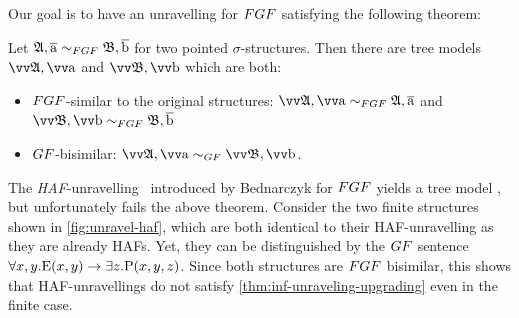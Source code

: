 Our goal is to have an  unravelling for $\FGF$ satisfying the following theorem:
\begin{theorem}\label{thm:inf-unraveling-upgrading}
  Let $\str{A}, \elemtuplea \bisimto_{\FGF} \str{B}, \elemtupleb$ for two pointed $\sigma$-structures.
  Then there are tree models $\unravel{A}, \elemtuptuplea$ and $\unravel{B}, \elemtuptupleb$ which are both:
  \begin{itemize}
    \item $\FGF$-similar to the original structures: $\unravel{A}, \elemtuptuplea \bisimto_{\FGF} \str{A}, \elemtuplea$ and $\unravel{B}, \elemtuptupleb \bisimto_{\FGF} \str{B}, \elemtupleb$
    \item $\GF$-bisimilar: $\unravel{A}, \elemtuptuplea \bisimto_{\GF} \unravel{B}, \elemtuptupleb$.
  \end{itemize}
\end{theorem}
The \emph{HAF}-unravelling~\cite[Sec 3.3]{Bednarczyk21} introduced by Bednarczyk for $\FGF$ yields  a tree model , but unfortunately fails  the above theorem.
Consider the two finite structures shown  in \cref{fig:unravel-haf},  which are both identical to their HAF-unravelling as they are already HAFs.
Yet, they can be distinguished by the  $\GF$ sentence $\forall{x,y}. \mathrm{E}(x,y) \to \exists z. \mathrm{P}(x,y,z)$.
Since both structures are $\FGF$ bisimilar, this shows that HAF-unravellings do not satisfy \cref{thm:inf-unraveling-upgrading} even in the finite case.

